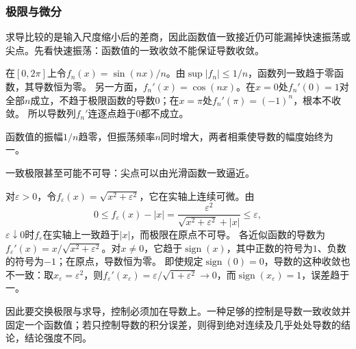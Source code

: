 \subsubsection{极限与微分}

求导比较的是输入尺度缩小后的差商，因此函数值一致接近仍可能漏掉快速振荡或尖点。先看快速振荡：函数值的一致收敛不能保证导数收敛。
\begin{example}[函数值一致趋零而导数不收敛]
\label{ex:analysis-oscillating-derivatives}
在$[0,2\pi]$上令$f_n(x)=\sin(nx)/n$。由$\sup|f_n|\leq1/n$，函数列一致趋于零函数，其导数恒为零。
另一方面，$f_n'(x)=\cos(nx)$。在$x=0$处$f_n'(0)=1$对全部$n$成立，不趋于极限函数的导数$0$；在$x=\pi$处$f_n'(\pi)=(-1)^n$，根本不收敛。
所以导数列$f_n'$连逐点趋于$0$都不成立。
\end{example}
函数值的振幅$1/n$趋零，但振荡频率$n$同时增大，两者相乘使导数的幅度始终为一。

一致极限甚至可能不可导：尖点可以由光滑函数一致逼近。
\begin{example}[光滑函数一致逼近绝对值函数]
\label{ex:analysis-smoothed-absolute-value}
对$\varepsilon>0$，令$f_\varepsilon(x)=\sqrt{x^2+\varepsilon^2}$，它在实轴上连续可微。由
\[
 0\leq f_\varepsilon(x)-|x|
 =\frac{\varepsilon^2}{\sqrt{x^2+\varepsilon^2}+|x|}\leq\varepsilon,
\]
$\varepsilon\downarrow0$时$f_\varepsilon$在实轴上一致趋于$|x|$，而极限在原点不可导。
各近似函数的导数为$f_\varepsilon'(x)=x/\sqrt{x^2+\varepsilon^2}$。对$x\neq0$，它趋于$\operatorname{sign}(x)$，其中正数的符号为$1$、负数的符号为$-1$；在原点，导数恒为零。
即使规定$\operatorname{sign}(0)=0$，导数的这种收敛也不一致：取$x_\varepsilon=\varepsilon^2$，则$f_\varepsilon'(x_\varepsilon)=\varepsilon/\sqrt{1+\varepsilon^2}\to0$，而$\operatorname{sign}(x_\varepsilon)=1$，误差趋于一。
\end{example}

因此要交换极限与求导，控制必须加在导数上。一种足够的控制是导数一致收敛并固定一个函数值；若只控制导数的积分误差，则得到绝对连续及几乎处处导数的结论，结论强度不同。

